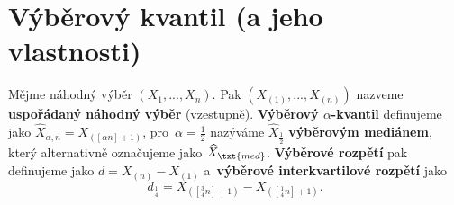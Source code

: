 \section{Výběrový kvantil (a jeho vlastnosti)}
\begin{define}
	Mějme náhodný výběr $(X_1,...,X_n)$. Pak $\left( X_{(1)},...,X_{(n)} \right)$ nazveme \textbf{uspořádaný náhodný výběr} (vzestupně). \textbf{Výběrový $\alpha$-kvantil} definujeme jako $\widehat{X}_{\alpha,n}=X_{([\alpha n]+1)} $, pro~$\alpha=\frac{1}{2}$ nazýváme $\widehat{X}_{\frac{1}{2}}$ \textbf{výběrovým mediánem}, který alternativně označujeme jako $\widehat{X}_\txt{med}$. \textbf{Výběrové rozpětí} pak definujeme jako $d=X_{(n)}-X_{(1)}$ a~\textbf{výběrové interkvartilové rozpětí} jako $$d_{\frac{1}{4}}=X_{\left( \left[\frac{3}{4}n\right]+1 \right)}-X_{\left( \left[\frac{1}{4}n\right]+1 \right)}.$$
\end{define}

